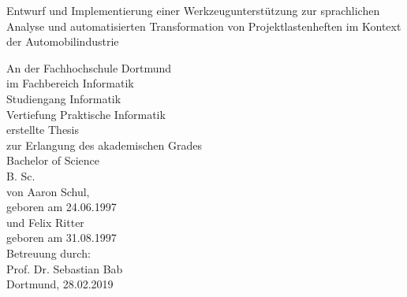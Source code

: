 \documentclass[12pt]{report}
\begin{document}
\begin{titlepage}
\raggedright
\begin{large}
Entwurf und Implementierung einer Werkzeugunterstützung zur sprachlichen Analyse und automatisierten Transformation von Projektlastenheften im Kontext der Automobilindustrie
\end{large}

\vfill\vfill\vfill\vfill
An der Fachhochschule Dortmund\\
\vfill
im Fachbereich Informatik\\
\vfill
Studiengang Informatik\\
\vfill
Vertiefung Praktische Informatik\\
\vfill
erstellte Thesis\\
\vfill\vfill\vfill\vfill
zur Erlangung des akademischen Grades\\
\vfill
Bachelor of Science\\
\vfill
B. Sc.\\
\vfill\vfill\vfill\vfill
von Aaron Schul, \\
\vfill
geboren am 24.06.1997\\
\vfill
und Felix Ritter\\
\vfill
geboren am 31.08.1997\\
\vfill\vfill
Betreuung durch:\\
\vfill
Prof. Dr. Sebastian Bab\\
\vfill
Dortmund, 28.02.2019\\
\end{titlepage}
\end{document}
